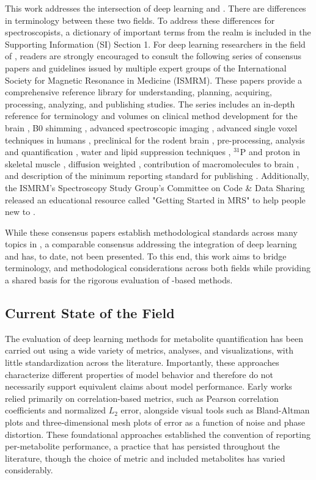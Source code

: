 This work addresses the intersection of deep learning and \MRS. There are differences in terminology between these two fields. To address these differences for spectroscopists, a dictionary of important terms from the \DL realm is included in the Supporting Information (SI) Section 1. For deep learning researchers in the field of \MRS, readers are strongly encouraged to consult the following series of consensus papers and guidelines issued by multiple \MRS expert groups of the International Society for Magnetic Resonance in Medicine (ISMRM). These papers provide a comprehensive reference library for understanding, planning, acquiring, processing, analyzing, and publishing \MRS studies. The series includes an in-depth reference for \MRS terminology \cite{Kreis2020} and volumes on \MRS clinical method development for the brain \cite{Wilson2019}, B0 shimming \cite{Juchem2021}, advanced spectroscopic imaging \cite{Maudsley2020}, advanced single voxel techniques in humans \cite{Oz2021}, preclinical \MRS for the rodent brain \cite{Lanz2021}, pre-processing, analysis and quantification \cite{Near2021}, water and lipid suppression techniques \cite{Tkac2021}, $^{31}$P and proton \MRS in skeletal muscle \cite{Meyerspeer2020,Krssak2021}, diffusion weighted \MRS \cite{Ligneul2023}, contribution of macromolecules to brain \MRS \cite{Cudalbu2021}, and description of the minimum reporting standard for publishing \cite{Lin2021}. Additionally, the ISMRM's Spectroscopy Study Group's Committee on Code \& Data Sharing released an educational resource \cite{Fleischer2022} called "Getting Started in MRS" to help people new to \MRS. 

While these consensus papers establish methodological standards across many topics in \MRS, a comparable consensus addressing the integration of deep learning and \MRS has, to date, not been presented. To this end, this work aims to bridge terminology, and methodological considerations across both fields while providing a shared basis for the rigorous evaluation of \DL-based \MRS methods.

\subsection{Current State of the Field}\label{sec:background:subsec:SOTF}
The evaluation of deep learning methods for \MRS metabolite quantification has been carried out using a wide variety of metrics, analyses, and visualizations, with little standardization across the literature. Importantly, these approaches characterize different properties of model behavior and therefore do not necessarily support equivalent claims about model performance. Early works \cite{Hiltunen2002,Bhat2006} relied primarily on correlation-based metrics, such as Pearson correlation coefficients and normalized $L_2$ error, alongside visual tools such as Bland-Altman plots and three-dimensional mesh plots of error as a function of noise and phase distortion. These foundational approaches established the convention of reporting per-metabolite performance, a practice that has persisted throughout the literature, though the choice of metric and included metabolites has varied considerably.

